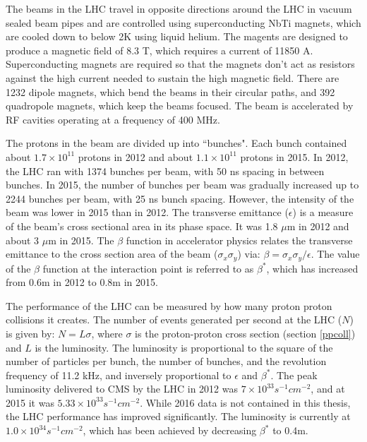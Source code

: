 \documentclass[oneside, letterpaper, oldfontcommands]{memoir}
\begin{document}
\qquad The beams in the LHC travel in opposite directions around the LHC in vacuum sealed beam pipes and are controlled using superconducting NbTi magnets, which are cooled down to below 2K using liquid helium. The magents are designed to produce a magnetic field of 8.3 T, which requires a current of 11850 A. Superconducting magnets are required so that the magnets don't act as resistors against the high current needed to sustain the high magnetic field. There are 1232 dipole magnets, which bend the beams in their circular paths, and 392 quadropole magnets, which keep the beams focused. The beam is accelerated by RF cavities operating at a frequency of 400 MHz.

\qquad The protons in the beam are divided up into ``bunches". Each bunch contained about $1.7 \times 10^{11}$ protons in 2012 and about $1.1 \times 10^{11}$ protons in 2015. In 2012, the LHC ran with 1374 bunches per beam, with 50 ns spacing in between bunches. In 2015, the number of bunches per beam was gradually increased up to 2244 bunches per beam, with 25 ns bunch spacing. However, the intensity of the beam was lower in 2015 than in 2012. The transverse emittance ($\epsilon$) is a measure of the beam's cross sectional area in its phase space. It was 1.8 $\mu$m in 2012 and about 3 $\mu$m in 2015. The $\beta$ function in accelerator physics relates the transverse emittance to the cross section area of the beam ($\sigma_{x}\sigma_{y}$) via: $ \beta	= \sigma_{x}\sigma_{y} / \epsilon$. The value of the $\beta$ function at the interaction point is referred to as $\beta^{*}$, which has increased from 0.6m in 2012 to 0.8m in 2015.

\qquad The performance of the LHC can be measured by how many proton proton collisions it creates. The number of events generated per second at the LHC ($N$) is given by: $N = L\sigma$, where $\sigma$ is the proton-proton cross section (section \ref{ppcoll}) and $L$ is the luminosity. The luminosity is proportional to the square of the number of particles per bunch, the number of bunches, and the revolution frequency of 11.2 kHz, and inversely proportional to $\epsilon$ and $\beta^{*}$. The peak luminosity delivered to CMS by the LHC in 2012 was $7 \times 10^{33} s^{-1} cm^{-2}$, and at 2015 it was $5.33 \times 10^{33} s^{-1} cm^{-2}$. While 2016 data is not contained in this thesis, the LHC performance has improved significantly. The luminosity is currently at $1.0 \times 10^{34} s^{-1} cm^{-2}$, which has been achieved by decreasing $\beta^{*}$ to 0.4m.
\end{document}
